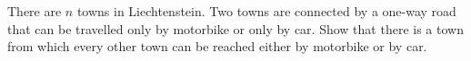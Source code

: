 There are $n$ towns in Liechtenstein. Two towns are connected by a one-way road that can be travelled only by motorbike or only by car.
Show that there is a town from which every other town can be reached either by motorbike or by car.

